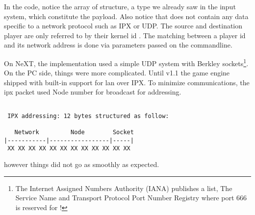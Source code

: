 \par
In the code, notice the array of  structure, a type we already saw in the input system, which constitute the payload. Also notice that  does not contain any data specific to a network protocol such as IPX or UDP. The source and destination player are only referred to by their kernel id . The matching between a player id and its network address is done via parameters passed on the commandline.\\
\par




\par
On NeXT, the implementation used a simple UDP system with Berkley sockets\footnote{The Internet Assigned Numbers Authority (IANA) publishes a list, The Service Name and Transport Protocol Port Number Registry where port 666 is reserved for \doom!}. On the PC side, things were more complicated. Until v1.1 the game engine shipped with built-in support for lan over IPX. To minimize communications, the ipx packet used Node number  for broadcast for addressing.\\
\par
\begin{verbatim}

 IPX addressing: 12 bytes structured as follow:

   Network         Node        Socket
|-----------|-----------------|-----|
 XX XX XX XX XX XX XX XX XX XX XX XX 

\end{verbatim}
\par
however things did not go as smoothly as expected.\\
\par
{}

